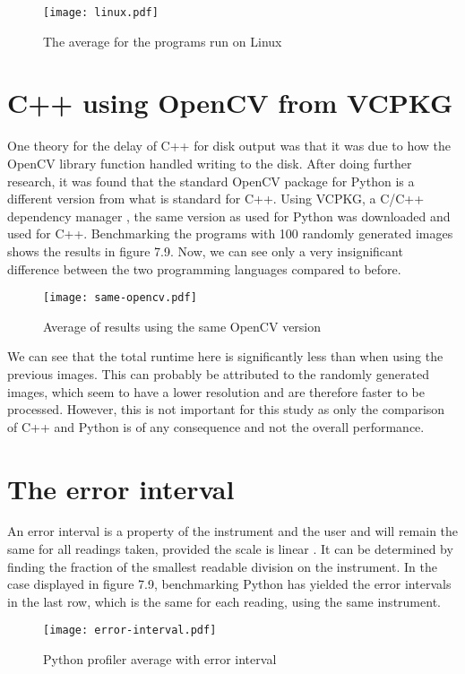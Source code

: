\begin{figure}[H]
	\centering
	\texttt{[image: linux.pdf]}
	\caption{The average for the programs run on Linux}
	\label{figure:linux}
\end{figure}

\section{C++ using OpenCV from VCPKG}
One theory for the delay of C++ for disk output was that it was due to how the OpenCV library function handled writing to the disk. After doing further research, it was found that the standard OpenCV package for Python is a different version from what is standard for C++. Using VCPKG, a C/C++ dependency manager \cite{vcpkg}, the same version as used for Python was downloaded and used for C++. Benchmarking the programs with 100 randomly generated images shows the results in figure 7.9. Now, we can see only a very insignificant difference between the two programming languages compared to before.

\begin{figure}[H]
	\centering
	\texttt{[image: same-opencv.pdf]}
	\caption{Average of results using the same OpenCV version}
	\label{figure:same-opencv}
\end{figure}

We can see that the total runtime here is significantly less than when using the previous images. This can probably be attributed to the randomly generated images, which seem to have a lower resolution and are therefore faster to be processed. However, this is not important for this study as only the comparison of C++ and Python is of any consequence and not the overall performance.

\section{The error interval}
An error interval is a property of the instrument and the user and will remain the same for all readings taken, provided the scale is linear \cite{errorinterval}. It can be determined by finding the fraction of the smallest readable division on the instrument. In the case displayed in figure 7.9, benchmarking Python has yielded the error intervals in the last row, which is the same for each reading, using the same instrument.

\begin{figure}[H]
	\centering
	\texttt{[image: error-interval.pdf]}
	\caption{Python profiler average with error interval}
	\label{figure:error-interval}
\end{figure}

